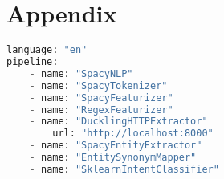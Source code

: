 


\makeFrontPage



\makeToc
    











\chapter{Appendix}
\begin{lstlisting}[caption={Detail Pipeline of Pretrained Embeddings Spacy}, label={lst:spacy_pipeline_detail},captionpos=b,frame=single,language={Python},commentstyle=\color{mygreen},keywordstyle=\color{blue},
    morekeywords={language, pipeline, name}]                
language: "en"
pipeline:
    - name: "SpacyNLP"
    - name: "SpacyTokenizer"
    - name: "SpacyFeaturizer"
    - name: "RegexFeaturizer"
    - name: "DucklingHTTPExtractor"
        url: "http://localhost:8000"
    - name: "SpacyEntityExtractor"
    - name: "EntitySynonymMapper"
    - name: "SklearnIntentClassifier"
\end{lstlisting} 

